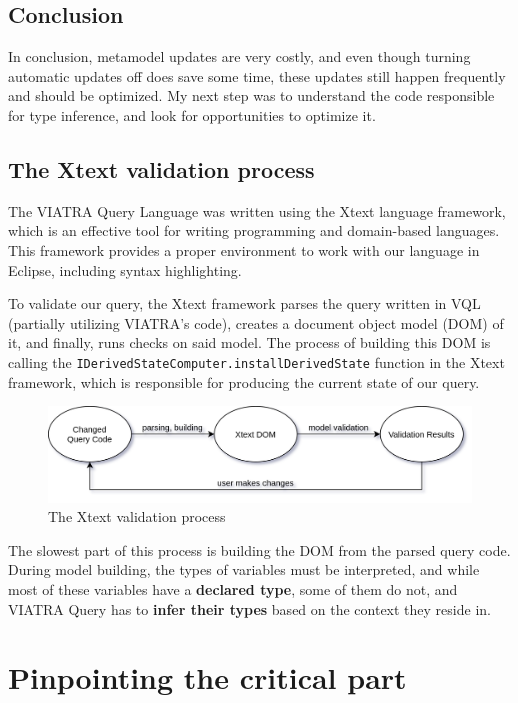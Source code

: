 \documentclass[11pt,a4paper,oneside]{report}
\begin{document}
\subsection{Conclusion}
In conclusion, metamodel updates are very costly, and even though turning
automatic updates off does save some time, these updates still happen
frequently and should be optimized. My next step was to understand the code
responsible for type inference, and look for opportunities to optimize it.

\subsection{The Xtext validation process}
The VIATRA Query Language was written using the Xtext language framework, which
is an effective tool for writing programming and domain-based languages. This
framework provides a proper environment to work with our language in Eclipse,
including syntax highlighting.

To validate our query, the Xtext framework parses the query written in VQL
(partially utilizing VIATRA's code), creates a document object model (DOM) of
it, and finally, runs checks on said model. The process of building this DOM is
calling the \texttt{IDerivedStateComputer.installDerivedState} function in the
Xtext framework, which is responsible for producing the current state of our
query.

\begin{figure}[ht]
\centering
\includegraphics[width=150mm, keepaspectratio]{figures/xtext-validation-process.png}
\caption{The Xtext validation process}
\label{fig:xtext-validation-process}
\end{figure}

The slowest part of this process is building the DOM from the parsed query code.
During model building, the types of variables must be interpreted, and while
most of these variables have a \textbf{declared type}, some of them do not, and
VIATRA Query has to \textbf{infer their types} based on the context they reside
in.

\section{Pinpointing the critical part}
\end{document}

